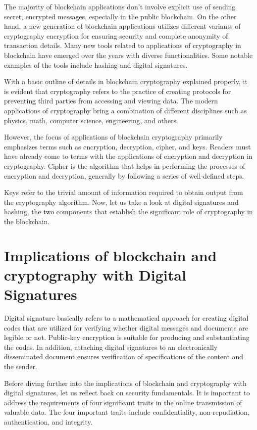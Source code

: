 \documentclass[BTech]{srmuthesis}
\begin{document}
 The majority of blockchain applications don’t involve explicit use of sending secret, encrypted messages, especially in the public blockchain. On the other hand, a new generation of blockchain applications utilizes different variants of cryptography encryption for ensuring security and complete anonymity of transaction details. Many new tools related to applications of cryptography in blockchain have emerged over the years with diverse functionalities. Some notable examples of the tools include hashing and digital signatures.          

 With a basic outline of details in blockchain cryptography explained properly, it is evident that cryptography refers to the practice of creating protocols for preventing third parties from accessing and viewing data. The modern applications of cryptography bring a combination of different disciplines such as physics, math, computer science, engineering, and others. 

 However, the focus of applications of blockchain cryptography primarily emphasizes terms such as encryption, decryption, cipher, and keys. Readers must have already come to terms with the applications of encryption and decryption in cryptography. Cipher is the algorithm that helps in performing the processes of encryption and decryption, generally by following a series of well-defined steps. 

 Keys refer to the trivial amount of information required to obtain output from the cryptography algorithm. Now, let us take a look at digital signatures and hashing, the two components that establish the significant role of cryptography in the blockchain. 

 \section{Implications of blockchain and cryptography with Digital Signatures}
  Digital signature basically refers to a mathematical approach for creating digital codes that are utilized for verifying whether digital messages and documents are legible or not. Public-key encryption is suitable for producing and substantiating the codes. In addition, attaching digital signatures to an electronically disseminated document ensures verification of specifications of the content and the sender.

  Before diving further into the implications of blockchain and cryptography with digital signatures, let us reflect back on security fundamentals. It is important to address the requirements of four significant traits in the online transmission of valuable data. The four important traits include confidentiality, non-repudiation, authentication, and integrity.
\end{document}

